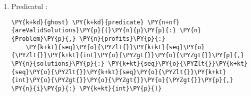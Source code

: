 \begin{sloppypar}
\begin{enumerate}
\begin{Verbatim}[commandchars=\\\{\}]
\PY{k+kd}{ghost} \PY{k+kd}{predicate} \PY{n+nf}{areValidPartialSolutions}\PY{p}{(}\PY{n}{p}\PY{p}{:} \PY{n}{Problem}\PY{p}{,} \PY{n}{profits}\PY{p}{:} 
    \PY{k+kt}{seq}\PY{o}{\PYZlt{}}\PY{k+kt}{seq}\PY{o}{\PYZlt{}}\PY{k+kt}{int}\PY{o}{\PYZgt{}}\PY{o}{\PYZgt{}}\PY{p}{,} \PY{n}{solutions}\PY{p}{:} \PY{k+kt}{seq}\PY{o}{\PYZlt{}}\PY{k+kt}{seq}\PY{o}{\PYZlt{}}\PY{k+kt}{seq}\PY{o}{\PYZlt{}}\PY{k+kt}{int}\PY{o}{\PYZgt{}}\PY{o}{\PYZgt{}}\PY{o}{\PYZgt{}}\PY{p}{,} 
    \PY{n}{partialProfits}\PY{p}{:} \PY{k+kt}{seq}\PY{o}{\PYZlt{}}\PY{k+kt}{int}\PY{o}{\PYZgt{}}\PY{p}{,} \PY{n}{partialSolutions}\PY{p}{:} \PY{k+kt}{seq}\PY{o}{\PYZlt{}}\PY{k+kt}{seq}\PY{o}{\PYZlt{}}\PY{k+kt}{int}\PY{o}{\PYZgt{}}\PY{o}{\PYZgt{}}\PY{p}{,} 
    \PY{n}{i}\PY{p}{:} \PY{k+kt}{int}\PY{p}{,} \PY{n}{j}\PY{p}{:} \PY{k+kt}{int}\PY{p}{)}    
  \PY{k}{requires} \PY{n}{isValidSubproblem}\PY{p}{(}\PY{n}{p}\PY{p}{,} \PY{n}{i}\PY{p}{,} \PY{n}{j}\PY{p}{)}
\PY{p}{\PYZob{}}
  \PY{o}{|}\PY{n}{partialSolutions}\PY{o}{|} \PY{o}{==} \PY{o}{|}\PY{n}{partialProfits}\PY{o}{|} \PY{o}{==} \PY{n}{j} \PY{o}{\PYZam{}\PYZam{}} 
  \PY{p}{(}\PY{k}{forall} \PY{n}{k} \PY{p}{::} \PY{l+m+mi}{0} \PY{o}{\PYZlt{}=} \PY{n}{k} \PY{o}{\PYZlt{}} \PY{o}{|}\PY{n}{partialSolutions}\PY{o}{|} \PY{o}{==}\PY{o}{\PYZgt{}} 
    \PY{n}{isOptimalPartialSolution}\PY{p}{(}\PY{n}{p}\PY{p}{,} \PY{n}{partialSolutions}\PY{p}{[}\PY{n}{k}\PY{p}{]}\PY{p}{,} \PY{n}{i}\PY{p}{,} \PY{n}{k}\PY{p}{)}\PY{p}{)} \PY{o}{\PYZam{}\PYZam{}} 
  \PY{p}{(}\PY{k}{forall} \PY{n}{k} \PY{p}{::} \PY{l+m+mi}{0} \PY{o}{\PYZlt{}=} \PY{n}{k} \PY{o}{\PYZlt{}} \PY{o}{|}\PY{n}{partialSolutions}\PY{o}{|} \PY{o}{==}\PY{o}{\PYZgt{}} 
    \PY{n}{gain}\PY{p}{(}\PY{n}{p}\PY{p}{,} \PY{n}{partialSolutions}\PY{p}{[}\PY{n}{k}\PY{p}{]}\PY{p}{)} \PY{o}{==} \PY{n}{partialProfits}\PY{p}{[}\PY{n}{k}\PY{p}{]}\PY{p}{)}
\PY{p}{\PYZcb{}}
\end{Verbatim}
    Acesta validează rezultatele obținute doar pentru subproblemele pasului curent, în funcție de modificările aduse datorită creșterii numărului de obiecte disponibile.
    \item Predicatul :
    \begin{Verbatim}[commandchars=\\\{\}]
\PY{k+kd}{ghost} \PY{k+kd}{predicate} \PY{n+nf}{areValidSolutions}\PY{p}{(}\PY{n}{p}\PY{p}{:} \PY{n}{Problem}\PY{p}{,} \PY{n}{profits}\PY{p}{:} 
    \PY{k+kt}{seq}\PY{o}{\PYZlt{}}\PY{k+kt}{seq}\PY{o}{\PYZlt{}}\PY{k+kt}{int}\PY{o}{\PYZgt{}}\PY{o}{\PYZgt{}}\PY{p}{,} \PY{n}{solutions}\PY{p}{:} \PY{k+kt}{seq}\PY{o}{\PYZlt{}}\PY{k+kt}{seq}\PY{o}{\PYZlt{}}\PY{k+kt}{seq}\PY{o}{\PYZlt{}}\PY{k+kt}{int}\PY{o}{\PYZgt{}}\PY{o}{\PYZgt{}}\PY{o}{\PYZgt{}}\PY{p}{,} \PY{n}{i}\PY{p}{:} \PY{k+kt}{int}\PY{p}{)}

\end{Verbatim}
\end{enumerate}
\end{sloppypar}
